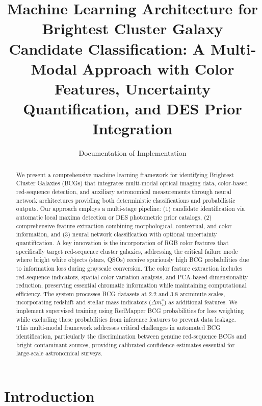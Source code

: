 \documentclass[twocolumn,10pt]{aastex631}
\begin{document}
\title{Machine Learning Architecture for Brightest Cluster Galaxy Candidate Classification: A Multi-Modal Approach with Color Features, Uncertainty Quantification, and DES Prior Integration}

\author{Documentation of Implementation}

\begin{abstract}
We present a comprehensive machine learning framework for identifying Brightest Cluster Galaxies (BCGs) that integrates multi-modal optical imaging data, color-based red-sequence detection, and auxiliary astronomical measurements through neural network architectures providing both deterministic classifications and probabilistic outputs. Our approach employs a multi-stage pipeline: (1) candidate identification via automatic local maxima detection or DES photometric prior catalogs, (2) comprehensive feature extraction combining morphological, contextual, and color information, and (3) neural network classification with optional uncertainty quantification. A key innovation is the incorporation of RGB color features that specifically target red-sequence cluster galaxies, addressing the critical failure mode where bright white objects (stars, QSOs) receive spuriously high BCG probabilities due to information loss during grayscale conversion. The color feature extraction includes red-sequence indicators, spatial color variation analysis, and PCA-based dimensionality reduction, preserving essential chromatic information while maintaining computational efficiency. The system processes BCG datasets at 2.2 and 3.8 arcminute scales, incorporating redshift and stellar mass indicators ($\Delta m^*_z$) as additional features. We implement supervised training using RedMapper BCG probabilities for loss weighting while excluding these probabilities from inference features to prevent data leakage. This multi-modal framework addresses critical challenges in automated BCG identification, particularly the discrimination between genuine red-sequence BCGs and bright contaminant sources, providing calibrated confidence estimates essential for large-scale astronomical surveys.
\end{abstract}


\section{Introduction}
\end{document}
